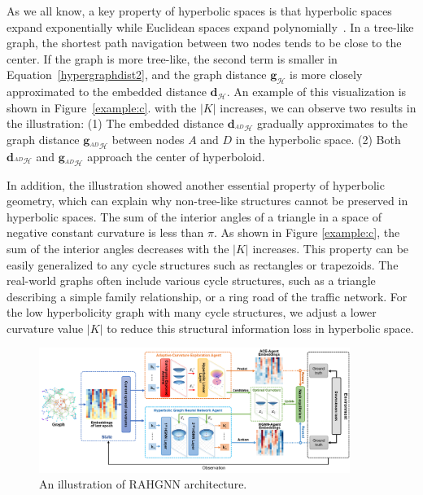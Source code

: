 As we all know, a key property of hyperbolic spaces is that hyperbolic spaces expand exponentially while Euclidean spaces expand polynomially~\cite{Krioukov2010Hyperbolic}.
In a tree-like graph, the shortest path navigation between two nodes tends to be close to the center. 
If the graph is more tree-like, the second term is smaller in Equation~\eqref{hypergraphdist2}, and the graph distance $\mathbf{g}_{\mathcal{H}}$ is more closely approximated to the embedded distance $\mathbf{d}_{\mathcal{H}}$.
An example of this visualization is shown in Figure~\ref{example:c}.
with the $|K|$ increases, we can observe two results in the illustration: 
(1) The embedded distance $\mathbf{d}_{^{AD}\mathcal{H}}$ gradually approximates to the graph distance $\mathbf{g}_{^{AD}\mathcal{H}}$ between nodes $A$ and $D$ in the hyperbolic space.
(2) Both $\mathbf{d}_{^{AD}\mathcal{H}}$ and $\mathbf{g}_{^{AD}\mathcal{H}}$ approach the center of hyperboloid. 

In addition, the illustration showed another essential property of hyperbolic geometry, which can explain why non-tree-like structures cannot be preserved in hyperbolic spaces. 
The sum of the interior angles of a triangle in a space of negative constant curvature is less than $\pi$. 
As shown in Figure \ref{example:c}, the sum of the interior angles decreases with the $|K|$ increases. 
This property can be easily generalized to any cycle structures such as rectangles or trapezoids. 
The real-world graphs often include various cycle structures, such as a triangle describing a simple family relationship, or a ring road of the traffic network. 
For the low hyperbolicity graph with many cycle structures, we adjust a lower curvature value $|K|$ to reduce this structural information loss in hyperbolic space. 

\begin{figure}[htb]
\centering
\includegraphics[width=0.9\textwidth]{figure/overall.png}
\caption{An illustration of RAHGNN architecture.}
\label{framework}
\end{figure}

